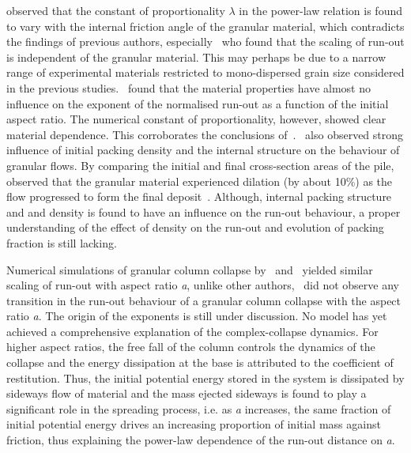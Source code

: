 \citet{Balmforth2005} observed that the constant of proportionality $\lambda$ 
in the power-law relation is found to vary with the internal friction angle of 
the granular material, which contradicts the findings of previous authors, 
especially~\citet{Lube2005} who found that the scaling of run-out is 
independent of the granular material. This may perhaps be due to a narrow range 
of experimental materials restricted to mono-dispersed grain size considered in 
the previous studies.~\citet{Balmforth2005} found that the material 
properties have almost no influence on the exponent of the normalised run-out 
as a function of the initial aspect ratio. The numerical constant of 
proportionality, however, showed clear material dependence. This corroborates 
the conclusions of~\citet{Lajeunesse2004}.~\citet{Daerr1999} also observed 
strong influence of initial packing density and the internal structure on the 
behaviour of granular flows. By comparing the initial and final cross-section 
areas of the pile,~\citet{Balmforth2005} observed that the granular material 
experienced dilation (by about 10\%) as the flow progressed to form the final 
deposit~\citep{Balmforth2005}. Although, internal packing structure and and 
density is found to have an influence on the run-out behaviour, a proper 
understanding of the effect of density on the run-out and evolution of packing 
fraction is still lacking.


Numerical simulations of 
granular column collapse by~\citet{Zenit2005} and~\citet{Staron2007a} yielded 
similar scaling of run-out with aspect ratio \textit{a}, unlike other 
authors,~\citet{Zenit2005} did not observe any transition in the run-out 
behaviour of a granular column collapse with the aspect ratio \textit{a}. The 
origin of the exponents is still under discussion. No model has yet achieved a 
comprehensive explanation of the complex-collapse dynamics. For higher aspect 
ratios, the free fall of the column controls the dynamics of 
the collapse and the energy dissipation at the base is attributed to the 
coefficient of restitution. Thus, the initial potential energy stored in the 
system is dissipated by sideways flow of material and the mass ejected sideways 
is found to play a significant role in the spreading process, i.e. as 
\textit{a} increases, the same fraction of initial potential energy drives an 
increasing proportion of initial mass against friction, thus explaining the 
power-law dependence of the run-out distance on \textit{a}. 

